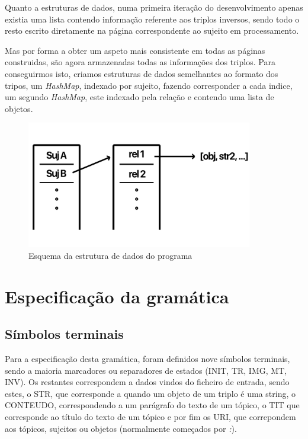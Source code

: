 \documentclass[a4paper]{report}
\begin{document}
Quanto a estruturas de dados, numa primeira iteração do desenvolvimento apenas
existia uma lista contendo informação referente aos triplos inversos, sendo todo
o resto escrito diretamente na página correspondente ao sujeito em
processamento. 

Mas por forma a obter um aspeto mais consistente em todas as páginas
construidas, são agora armazenadas todas as informações dos triplos.
Para conseguirmos isto, criamos estruturas de dados semelhantes ao formato dos
tripos, um \textit{HashMap}, indexado por sujeito, fazendo corresponder a cada
indice, um segundo \textit{HashMap}, este indexado pela relação e contendo uma
lista de objetos.

\begin{figure}[H]
    \centering
    \includegraphics[width=0.88\textwidth]{data_struct.png}
    \caption{Esquema da estrutura de dados do programa}
\end{figure}

\section{Especificação da gramática}

\subsection{Símbolos terminais}

Para a especificação desta gramática, foram definidos nove símbolos terminais,
sendo a maioria marcadores ou separadores de estados (INIT, TR, IMG, MT, INV).
Os restantes correspondem a dados vindos do ficheiro de entrada, sendo estes, o
STR, que corresponde a quando um objeto de um triplo é uma string, o CONTEUDO,
correspondendo a um parágrafo do texto de um tópico, o TIT que corresponde ao
título do texto de um tópico e por fim os URI, que correpondem aos tópicos,
sujeitos ou objetos (normalmente começados por \textit{:}).
\end{document}
